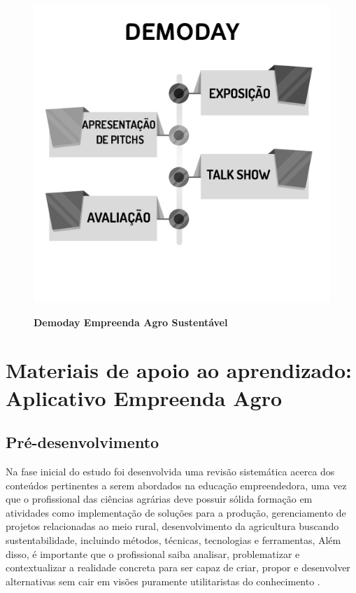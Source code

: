 \begin{figure}[H]
\centering
\caption{\textbf{Demoday Empreenda Agro Sustentável}}
\includegraphics[scale=0.4]{Imagens/workshop-04.png}
\label{figura_33}
\end{figure}


\section{Materiais de apoio ao aprendizado: Aplicativo Empreenda Agro}

\subsection{Pré-desenvolvimento}

Na fase inicial do estudo foi desenvolvida uma revisão sistemática acerca dos conteúdos pertinentes a serem abordados na educação empreendedora, uma vez que o profissional das ciências agrárias deve possuir sólida formação em atividades como implementação de soluções para a produção, gerenciamento de projetos relacionadas ao meio rural, desenvolvimento da agricultura buscando sustentabilidade, incluindo métodos, técnicas, tecnologias e ferramentas, Além disso, é importante que o profissional saiba analisar, problematizar e contextualizar a realidade concreta para ser capaz de criar, propor e desenvolver alternativas sem cair em visões puramente utilitaristas do conhecimento \cite{cavalcanti_da_2019}. 


